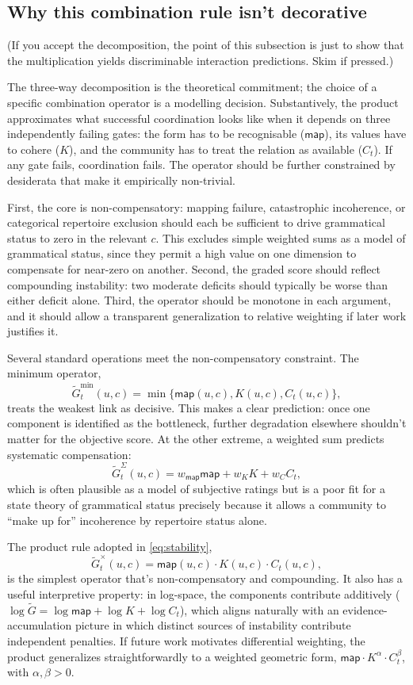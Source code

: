 \documentclass[12pt,letterpaper]{article}
\begin{document}
\subsection{Why this combination rule isn't decorative}\label{sec:combination}

(If you accept the decomposition, the point of this subsection is just to show that the multiplication yields discriminable interaction predictions. Skim if pressed.)

The three-way decomposition is the theoretical commitment; the choice of a specific combination operator is a modelling decision. Substantively, the product approximates what successful coordination looks like when it depends on three independently failing gates: the form has to be recognisable ($\mathsf{map}$), its values have to cohere ($K$), and the community has to treat the relation as available ($C_t$). If any gate fails, coordination fails. The operator should be further constrained by desiderata that make it empirically non-trivial.

First, the core is non-compensatory: mapping failure, catastrophic incoherence, or categorical repertoire exclusion should each be sufficient to drive grammatical status to zero in the relevant $c$. This excludes simple weighted sums as a model of grammatical status, since they permit a high value on one dimension to compensate for near-zero on another. Second, the graded score should reflect compounding instability: two moderate deficits should typically be worse than either deficit alone. Third, the operator should be monotone in each argument, and it should allow a transparent generalization to relative weighting if later work justifies it.

Several standard operations meet the non-compensatory constraint. The minimum operator,
\[
\widetilde{G}^{\min}_t(u,c)=\min\{\mathsf{map}(u,c),K(u,c),C_t(u,c)\},
\]
treats the weakest link as decisive. This makes a clear prediction: once one component is identified as the bottleneck, further degradation elsewhere shouldn't matter for the objective score. At the other extreme, a weighted sum predicts systematic compensation:
\[
\widetilde{G}^{\Sigma}_t(u,c)=w_{\mathsf{map}}\mathsf{map}+w_KK+w_CC_t,
\]
which is often plausible as a model of subjective ratings but is a poor fit for a state theory of grammatical status precisely because it allows a community to \enquote{make up for} incoherence by repertoire status alone.

The product rule adopted in \eqref{eq:stability},
\[
\widetilde{G}^{\times}_t(u,c)=\mathsf{map}(u,c)\cdot K(u,c)\cdot C_t(u,c),
\]
is the simplest operator that's non-compensatory and compounding. It also has a useful interpretive property: in log-space, the components contribute additively ($\log \widetilde{G}=\log \mathsf{map}+\log K+\log C_t$), which aligns naturally with an evidence-accumulation picture in which distinct sources of instability contribute independent penalties. If future work motivates differential weighting, the product generalizes straightforwardly to a weighted geometric form, $\mathsf{map}\cdot K^{\alpha}\cdot C_t^{\beta}$, with $\alpha,\beta>0$.
\end{document}
